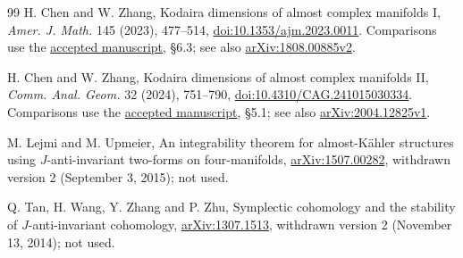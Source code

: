 \documentclass[11pt]{article}
\begin{document}
\begin{thebibliography}{99}
H. Chen and W. Zhang, Kodaira dimensions of almost complex manifolds I,
\emph{Amer. J. Math.} 145 (2023), 477--514,
\href{https://doi.org/10.1353/ajm.2023.0011}{doi:10.1353/ajm.2023.0011}.
Comparisons use the
\href{https://wrap.warwick.ac.uk/id/eprint/164863/1/WRAP-Kodaira-dimensions-almost-complex-manifolds-I-Zhang-2022.pdf}{accepted manuscript},
\S6.3; see also
\href{https://arxiv.org/abs/1808.00885v2}{arXiv:1808.00885v2}.

H. Chen and W. Zhang, Kodaira dimensions of almost complex manifolds II,
\emph{Comm. Anal. Geom.} 32 (2024), 751--790,
\href{https://doi.org/10.4310/CAG.241015030334}{doi:10.4310/CAG.241015030334}.
Comparisons use the
\href{https://wrap.warwick.ac.uk/id/eprint/163848/1/WRAP-Kodaira-dimensions-almost-complex-manifolds-II-Zhang-2022.pdf}{accepted manuscript},
\S5.1; see also
\href{https://arxiv.org/abs/2004.12825v1}{arXiv:2004.12825v1}.

M. Lejmi and M. Upmeier, An integrability theorem for almost-K\"ahler
structures using $J$-anti-invariant two-forms on four-manifolds,
\href{https://arxiv.org/abs/1507.00282}{arXiv:1507.00282},
withdrawn version 2 (September 3, 2015); not used.

Q. Tan, H. Wang, Y. Zhang and P. Zhu,
Symplectic cohomology and the stability of $J$-anti-invariant cohomology,
\href{https://arxiv.org/abs/1307.1513}{arXiv:1307.1513},
withdrawn version 2 (November 13, 2014); not used.
\end{thebibliography}
\end{document}
